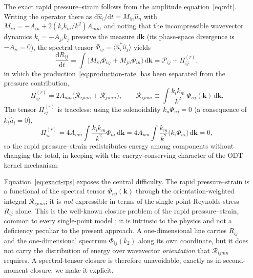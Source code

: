 \documentclass[lineno]{JFM-FLM_Au}
\begin{document}
The exact rapid pressure--strain follows from the amplitude
equation~\eqref{eq:rdt}. Writing the operator there as
$\mathrm{d}\hat{u}_i/\mathrm{d}t = M_{in}\hat{u}_n$ with
$M_{in}=-A_{in}+2(k_ik_m/k^2)A_{mn}$, and noting that the incompressible
wavevector dynamics $\dot{k}_i=-A_{ji}k_j$ preserve the measure
$\mathrm{d}\boldsymbol{k}$ (its phase-space divergence is $-A_{ii}=0$), the
spectral tensor $\Phi_{ij}=\langle \hat{u}_i^{*}\hat{u}_j\rangle$ yields
\begin{equation}
  \frac{\mathrm{d}R_{ij}}{\mathrm{d}t}
  = \int\!\big(M_{in}\Phi_{nj}+M_{jn}\Phi_{in}\big)\,
    \mathrm{d}\boldsymbol{k}
  = \mathcal{P}_{ij} + \Pi_{ij}^{(r)},
  \label{eq:dRdt-rdt}
\end{equation}
in which the production~\eqref{eq:production-rate} has been separated from
the pressure contribution,
\begin{equation}
  \Pi_{ij}^{(r)} = 2A_{mn}\big(\mathcal{R}_{ijmn}+\mathcal{R}_{jimn}\big),
  \qquad
  \mathcal{R}_{ijmn} \equiv
  \int \frac{k_i k_m}{k^2}\,\Phi_{nj}(\boldsymbol{k})\,
  \mathrm{d}\boldsymbol{k}.
  \label{eq:exact-rps}
\end{equation}
The tensor $\Pi_{ij}^{(r)}$ is traceless: using the solenoidality
$k_n\Phi_{nj}=0$ (a consequence of $k_i\hat{u}_i=0$),
\begin{equation}
  \Pi_{ii}^{(r)} = 4A_{mn}\!\int\frac{k_i k_m}{k^2}\Phi_{ni}\,
  \mathrm{d}\boldsymbol{k}
  = 4A_{mn}\!\int\frac{k_m}{k^2}\big(k_i\Phi_{ni}\big)\,
  \mathrm{d}\boldsymbol{k}=0,
  \label{eq:traceless}
\end{equation}
so the rapid pressure--strain redistributes energy among components
without changing the total, in keeping with the energy-conserving
character of the ODT kernel mechanism.

Equation~\eqref{eq:exact-rps} exposes the central difficulty. The rapid
pressure--strain is a functional of the spectral tensor $\Phi_{nj}
(\boldsymbol{k})$ through the orientation-weighted integral
$\mathcal{R}_{ijmn}$; it is \emph{not} expressible in terms of the
single-point Reynolds stress $R_{ij}$ alone. This is the well-known closure
problem of the rapid pressure--strain, common to every single-point model
\citep{Crow1968,LaunderReeceRodi1975,Pope2000}; it is intrinsic to the
physics and not a deficiency peculiar to the present approach. A
one-dimensional line carries $R_{ij}$ and the one-dimensional spectrum
$\Phi_{ij}(k_2)$ along its own coordinate, but it does not carry the
distribution of energy over wavevector \emph{orientation} that
$\mathcal{R}_{ijmn}$ requires. A spectral-tensor closure is therefore
unavoidable, exactly as in second-moment closure; we make it explicit.
\end{document}
